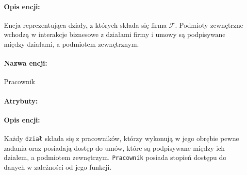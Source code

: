 \documentclass{article}
\begin{document}
\paragraph{Opis encji: \\}
Encja reprezentująca działy, z których składa się firma $\mathcal{F}$. Podmioty zewnętrzne wchodzą w interakcje 
biznesowe z działami firmy i umowy są podpisywane między działami, a podmiotem zewnętrznym.
\paragraph{Nazwa encji:\\ }
Pracownik
\paragraph{Atrybuty:\\ }
\begin{table}[H]
\end{table}
\paragraph{Opis encji: \\}
Każdy \texttt{dział} składa się z pracowników, którzy wykonują w jego obrębie pewne zadania oraz posiadają dostęp do
umów, które są podpisywane między ich działem, a podmiotem zewnętrzym. \texttt{Pracownik} posiada stopień dostępu do danych w zależności od jego funkcji.
\end{document}
